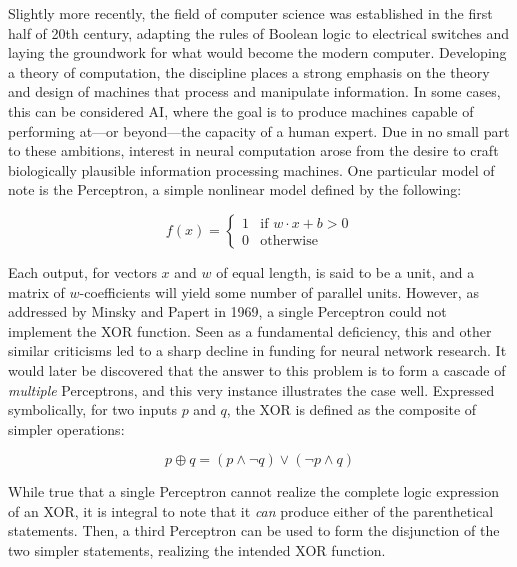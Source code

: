 Slightly more recently, the field of computer science was established in the first half of 20th century, adapting the rules of Boolean logic to electrical switches and laying the groundwork for what would become the modern computer.
Developing a theory of computation, the discipline places a strong emphasis on the theory and design of machines that process and manipulate information.
In some cases, this can be considered AI, where the goal is to produce machines capable of performing at---or beyond---the capacity of a human expert.
Due in no small part to these ambitions, interest in neural computation arose from the desire to craft biologically plausible information processing machines.
One particular model of note is the Perceptron, a simple nonlinear model defined by the following:

\begin{equation}
\label{eq:perceptron}
f(x) = \begin{cases}1 & \text{if }w \cdot x + b > 0\\0 & \text{otherwise}\end{cases}
\end{equation}

Each output, for vectors $x$ and $w$ of equal length, is said to be a unit, and a matrix of $w$-coefficients will yield some number of parallel units.
However, as addressed by Minsky and Papert \cite{Minsky1969} in 1969, a single Perceptron could not implement the XOR function.
Seen as a fundamental deficiency, this and other similar criticisms led to a sharp decline in funding for neural network research.
It would later be discovered that the answer to this problem is to form a cascade of \emph{multiple} Perceptrons, and this very instance illustrates the case well.
Expressed symbolically, for two inputs $p$ and $q$, the XOR is defined as the composite of simpler operations:

\begin{equation}
\label{eq:xor}
p \oplus q = (p \wedge \neg q) \vee (\neg p \wedge q)
\end{equation}

\noindent While true that a single Perceptron cannot realize the complete logic expression of an XOR, it is integral to note that it \emph{can} produce either of the parenthetical statements.
Then, a third Perceptron can be used to form the disjunction of the two simpler statements, realizing the intended XOR function.

